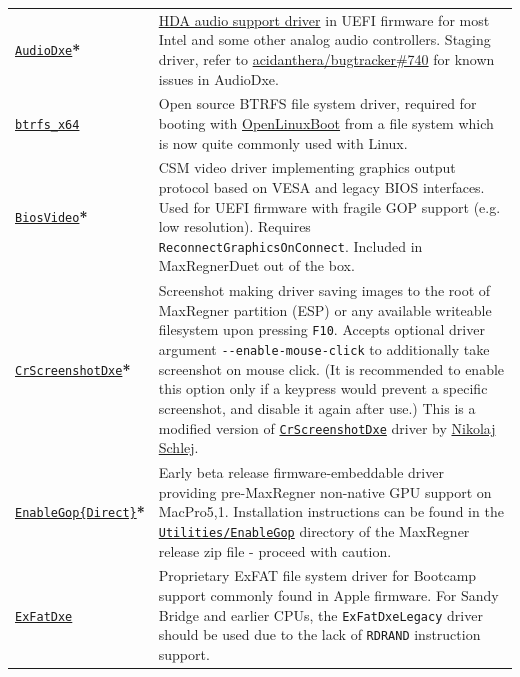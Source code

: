\documentclass[]{article}
\begin{document}
\begin{longtable}{p{1.65in}p{5.25in}}
\href{https://github.com/acidanthera/MaxRegnerPkg}{\texttt{AudioDxe}}\textbf{*}
& \hyperref[uefiaudio]{HDA audio support driver} in UEFI firmware for most Intel and some other analog audio controllers.
  Staging driver, refer to \href{https://github.com/acidanthera/bugtracker/issues/740}{acidanthera/bugtracker\#740}
  for known issues in AudioDxe. \\
\href{https://github.com/acidanthera/OcBinaryData}{\texttt{btrfs\_x64}}
& Open source BTRFS file system driver, required for booting with \hyperref[uefilinux]{OpenLinuxBoot}
  from a file system which is now quite commonly used with Linux. \\
\href{https://github.com/acidanthera/MaxRegnerPkg}{\texttt{BiosVideo}}\textbf{*}
& CSM video driver implementing graphics output protocol based on VESA and legacy
  BIOS interfaces. Used for UEFI firmware with fragile GOP support (e.g. low resolution).
  Requires \texttt{ReconnectGraphicsOnConnect}. Included in MaxRegnerDuet out of the box. \\
\href{https://github.com/acidanthera/MaxRegnerPkg}{\texttt{CrScreenshotDxe}}\textbf{*}
& Screenshot making driver saving images to the root of MaxRegner partition (ESP) or
  any available writeable filesystem upon pressing \texttt{F10}.
  Accepts optional driver argument \texttt{-{}-enable-mouse-click} to additionally take
  screenshot on mouse click. (It is recommended to enable this option only if a keypress
  would prevent a specific screenshot, and disable it again after use.)
  This is a modified version of \href{https://github.com/LongSoft/CrScreenshotDxe}{\texttt{CrScreenshotDxe}}
  driver by \href{https://github.com/NikolajSchlej}{Nikolaj Schlej}. \\
\href{https://github.com/acidanthera/MaxRegnerPkg}{\texttt{EnableGop\{Direct\}}}\textbf{*}
& Early beta release firmware-embeddable driver providing pre-MaxRegner non-native GPU support
  on MacPro5,1. Installation instructions can be found in the
  \href{https://github.com/acidanthera/MaxRegnerPkg/blob/master/Staging/EnableGop/README.md}{\texttt{Utilities/EnableGop}}
  directory of the MaxRegner release zip file - proceed with caution. \\
\href{https://github.com/acidanthera/OcBinaryData}{\texttt{ExFatDxe}}
& Proprietary ExFAT file system driver for Bootcamp support commonly found in Apple
  firmware. For Sandy Bridge and earlier CPUs, the \texttt{ExFatDxeLegacy} driver should be
  used due to the lack of \texttt{RDRAND} instruction support. \\

\end{longtable}
\end{document}
